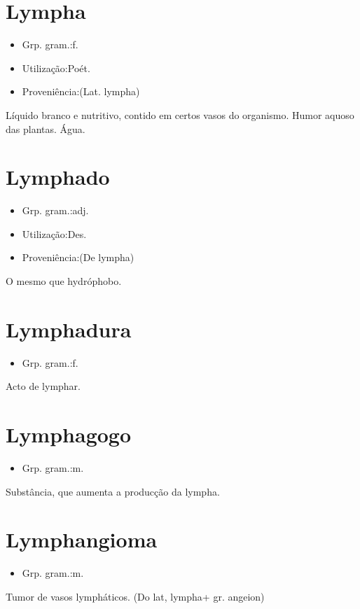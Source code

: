 \section{Lympha}
\begin{itemize}
\item {Grp. gram.:f.}
\end{itemize}
\begin{itemize}
\item {Utilização:Poét.}
\end{itemize}
\begin{itemize}
\item {Proveniência:(Lat. \textunderscore lympha\textunderscore )}
\end{itemize}
Líquido branco e nutritivo, contido em certos vasos do organismo.
Humor aquoso das plantas.
Água.
\section{Lymphado}
\begin{itemize}
\item {Grp. gram.:adj.}
\end{itemize}
\begin{itemize}
\item {Utilização:Des.}
\end{itemize}
\begin{itemize}
\item {Proveniência:(De \textunderscore lympha\textunderscore )}
\end{itemize}
O mesmo que \textunderscore hydróphobo\textunderscore .
\section{Lymphadura}
\begin{itemize}
\item {Grp. gram.:f.}
\end{itemize}
Acto de lymphar.
\section{Lymphagogo}
\begin{itemize}
\item {Grp. gram.:m.}
\end{itemize}
Substância, que aumenta a producção da lympha.
\section{Lymphangioma}
\begin{itemize}
\item {Grp. gram.:m.}
\end{itemize}
Tumor de vasos lympháticos.
(Do lat, \textunderscore lympha\textunderscore  + gr. \textunderscore angeion\textunderscore )
